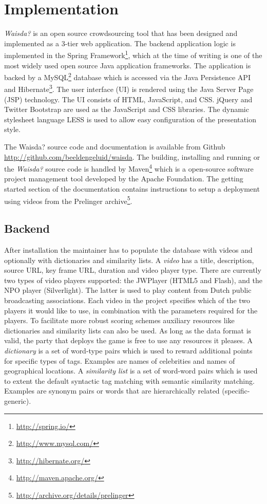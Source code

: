 \section{Implementation}
\textit{Waisda?} is an open source crowdsourcing tool that has been designed and implemented as a 3-tier web application. The backend application logic is implemented in the Spring Framework\footnote{\url{http://spring.io/}}, which at the time of writing is one of the most widely used open source Java application frameworks. The application is backed by a MySQL\footnote{\url{http://www.mysql.com/}} database which is accessed via the Java Persistence API and Hibernate\footnote{\url{http://hibernate.org/}}. The user interface (UI) is rendered using the Java Server Page (JSP) technology. The UI consists of HTML, JavaScript, and CSS. jQuery and Twitter Bootstrap are used as the JavaScript and CSS libraries. The dynamic
stylesheet language LESS is used to allow easy configuration of the presentation style.

The Waisda? source code and documentation is available from Github \url{http://github.com/beeldengeluid/waisda}. The building, installing and running or the \textit{Waisda?} source code is handled by Maven\footnote{\url{http://maven.apache.org/}} which is a open-source software project management tool developed by the Apache Foundation. The getting started section of the documentation contains instructions to setup a deployment using videos from the Prelinger archive\footnote{\url{http://archive.org/details/prelinger}}.

\subsection{Backend}
After installation the maintainer has to populate the database with videos and optionally with dictionaries and similarity lists. A \textit{video} has a title, description, source URL, key frame URL, duration and video player type. There are currently two types of video players supported: the JWPlayer (HTML5 and Flash), and the NPO player (Silverlight). The latter is used to play content from Dutch public broadcasting associations. Each video in the project specifies which of the two players it would like to use, in combination with the parameters required for the players. To facilitate more robust scoring schemes auxiliary resources like dictionaries and similarity lists can also be used. As long as the data format is valid, the party that deploys the game is free to use any resources it pleases. A \textit{dictionary} is a set of word-type pairs which is used to reward additional points for specific types of tags. Examples are names of celebrities and names of geographical locations. A \textit{similarity list} is a set of word-word pairs which is used to extent the default syntactic tag matching with semantic similarity matching. Examples are synonym pairs or words that are hierarchically related (specific-generic).

